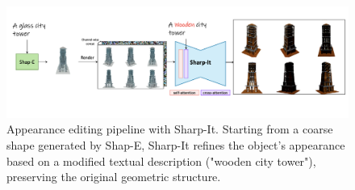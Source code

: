 \begin{figure}[t]
  \centering
  \includegraphics[width=\linewidth]{images/Screenshot 2025-05-03 at 17.06.15.png} %
  \caption{
    Appearance editing pipeline with Sharp-It. Starting from a coarse shape generated by Shap-E, Sharp-It refines the object's appearance based on a modified textual description ("wooden city tower"), preserving the original geometric structure.
  }
  \label{fig:appearance-editing}
\end{figure}